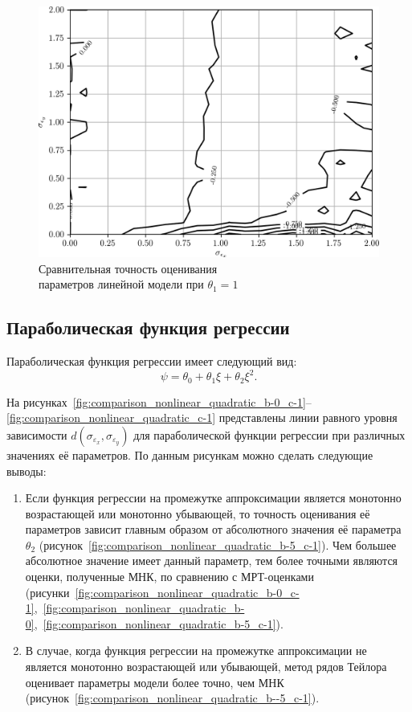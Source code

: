 \begin{figure}[h]
  \centering
  \includegraphics[width=135mm]{fig/nonlinear/linear/a-0_b-1.png}
  \caption{
    Сравнительная точность оценивания \\
    параметров линейной модели при \( \theta_1 = 1 \)
  }\label{fig:comparison_nonlinear_linear}
\end{figure}

\subsection{Параболическая функция регрессии}

Параболическая функция регрессии имеет следующий вид:
\[ \psi = \theta_0 + \theta_1 \xi + \theta_2 \xi^2. \]

На рисунках~\ref{fig:comparison_nonlinear_quadratic_b-0_c-1}--\ref{fig:comparison_nonlinear_quadratic_c-1} представлены линии равного уровня зависимости
\( d(\sigma_{\varepsilon_x}, \sigma_{\varepsilon_y}) \)
для параболической функции регрессии при различных значениях её параметров.
По данным рисункам можно сделать следующие выводы:
\begin{enumerate}
\item Если функция регрессии на промежутке аппроксимации является монотонно
  возрастающей или монотонно убывающей,
  то точность оценивания её параметров зависит главным образом от
  абсолютного значения её параметра \( \theta_2 \)
  (рисунок~\ref{fig:comparison_nonlinear_quadratic_b-5_c-1}).
  Чем большее абсолютное значение имеет данный параметр,
  тем более точными являются оценки, полученные МНК,
  по сравнению с МРТ-оценками
  (рисунки~\ref{fig:comparison_nonlinear_quadratic_b-0_c-1},~\ref{fig:comparison_nonlinear_quadratic_b-0},~\ref{fig:comparison_nonlinear_quadratic_b-5_c-1}).
\item В случае, когда функция регрессии на промежутке аппроксимации не является
  монотонно возрастающей или убывающей,
  метод рядов Тейлора оценивает параметры модели более точно, чем МНК
  (рисунок~\ref{fig:comparison_nonlinear_quadratic_b--5_c-1}).
\end{enumerate}

